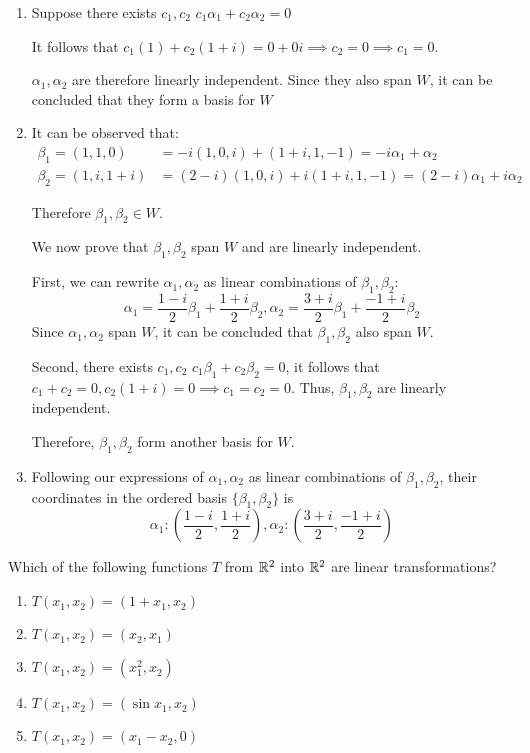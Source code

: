 \documentclass[a4paper, 10pt]{article}
\begin{document}
\begin{solution}
    \begin{enumerate} [label=(\alph*)]
        \item Suppose there exists \(c_1, c_2\) \st \(c_1\alpha_1 + c_2\alpha_2 = 0\)
        
        It follows that \(c_1(1) + c_2(1 + i) = 0 + 0i \implies c_2 = 0 \implies c_1 = 0\).

        \(\alpha_1, \alpha_2\) are therefore linearly independent. Since they also span \(W\), it can be concluded that they form a basis for \(W\)
        \item It can be observed that: \begin{align*}
            \beta_1 = (1, 1, 0) &= -i(1, 0, i) + (1+i, 1, -1) = -i\alpha_1 + \alpha_2 \\
            \beta_2 = (1, i, 1+i) &= (2-i)(1, 0, i) + i(1+i, 1, -1) = (2-i)\alpha_1 + i\alpha_2
        \end{align*}

        Therefore \(\beta_1, \beta_2 \in W\).

        We now prove that \(\beta_1, \beta_2\) span \(W\) and are linearly independent.

        First, we can rewrite \(\alpha_1, \alpha_2\) as linear combinations of \(\beta_1, \beta_2\): \[
        \alpha_1 = \frac{1-i}{2}\beta_1 + \frac{1+i}{2} \beta_2, \alpha_2 = \frac{3+i}{2}\beta_1 + \frac{-1 + i}{2} \beta_2
        \]
        Since \(\alpha_1, \alpha_2\) span \(W\), it can be concluded that \(\beta_1, \beta_2\) also span \(W\).

        Second, there exists \(c_1, c_2\) \st \(c_1\beta_1 + c_2\beta_2 = 0\), it follows that \(c_1 + c_2 = 0, c_2(1+i) = 0 \implies c_1 = c_2 = 0\). Thus, \(\beta_1, \beta_2\) are linearly independent.

        Therefore, \(\beta_1, \beta_2\) form another basis for \(W\).
        \item Following our expressions of \(\alpha_1, \alpha_2\) as linear combinations of \(\beta_1, \beta_2\), their coordinates in the ordered basis \(\{\beta_1, \beta_2\}\) is \[
        \alpha_1: \left(\frac{1-i}{2},\frac{1+i}{2}\right), \alpha_2: \left(\frac{3+i}{2},\frac{-1 + i}{2}\right)
        \]
    \end{enumerate}
\end{solution}
\begin{problem} 
    Which of the following functions \(T\) from \(\mathbb{R}^2\) into \(\mathbb{R}^2\) are linear transformations?
    \begin{enumerate} [label=(\alph*)]
        \item \(T(x_1, x_2) = (1 + x_1, x_2)\)
        \item \(T(x_1, x_2) = (x_2, x_1)\)
        \item \(T(x_1, x_2) = (x_1^2, x_2)\)
        \item \(T(x_1, x_2) = (\sin x_1, x_2)\)
        \item \(T(x_1, x_2) = (x_1 - x_2, 0)\)
    \end{enumerate}
\end{problem}
\end{document}
